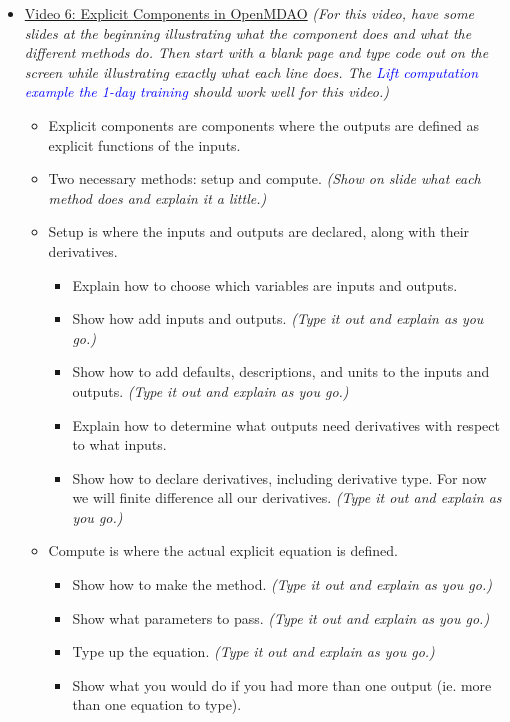 \documentclass[12pt, letterpaper]{article}
\begin{document}
\begin{itemize}
	\item \underline{Video 6: Explicit Components in OpenMDAO} \textit{(For this video, have some slides at the beginning illustrating what the 				component does and what the different methods do. Then start with a blank page and type code out on the screen while illustrating exactly what each line does. The \textcolor{blue}{Lift computation example the 1-day training} should work well for this video.)}
		\begin{itemize}
			\item Explicit components are components where the outputs are defined as explicit functions of the inputs.
			\item Two necessary methods: setup and compute. \textit{(Show on slide what each method does and explain it a little.)}
			\item Setup is where the inputs and outputs are declared, along with their derivatives.
				\begin{itemize}
					\item Explain how to choose which variables are inputs and outputs.
					\item Show how add inputs and outputs. \textit{(Type it out and explain as you go.)}
					\item Show how to add defaults, descriptions, and units to the inputs and outputs. \textit{(Type it out and explain as you go.)}
					\item Explain how to determine what outputs need derivatives with respect to what inputs.
					\item Show how to declare derivatives, including derivative type. For now we will finite difference all our derivatives. \textit{(Type it out and explain as you go.)}
				\end{itemize}
			\item Compute is where the actual explicit equation is defined.
				\begin{itemize}
					\item Show how to make the method. \textit{(Type it out and explain as you go.)}
					\item Show what parameters to pass. \textit{(Type it out and explain as you go.)}
					\item Type up the equation. \textit{(Type it out and explain as you go.)}
					\item Show what you would do if you had more than one output (ie. more than one equation to type).
				\end{itemize}

\end{itemize}
\end{itemize}
\end{document}
